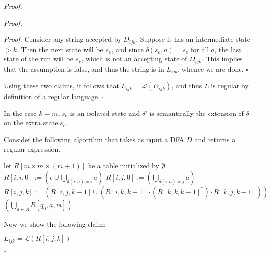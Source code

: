 \documentclass[a4paper]{article}
\newenvironment{proof}{\begin{breakbox}\textit{Proof.}}{\hfill$\square$\end{breakbox}}
\newcommand{\mc}{\mathcal}
\renewcommand{\L}{\mc{L}}
\begin{document}
\begin{proof}
\begin{proof}
        \begin{proof}
            Consider any string accepted by $D_{ijk}$. Suppose it has an intermediate state $> k$. Then the next state will be $s_e$, and since $\delta(s_e, a) = s_e$ for all $a$, the last state of
            the run will be $s_e$, which is not an accepting state of $D_{ijk}$. This implies that the assumption is false, and thus the string is in $L_{ijk}$, whence we are done.
        \end{proof}

        Using these two claims, it follows that $L_{ijk} = \L(D_{ijk})$, and thus $L$ is regular by definition of a regular language.
    \end{proof}
    \begin{note}
        In the case $k = m$, $s_e$ is an isolated state and $\delta'$ is semantically the extension of $\delta$ on the extra state $s_e$.
    \end{note}

    Consider the following algorithm that takes as input a DFA $D$ and returns a regular expression.\\

    \begin{algorithmic}[1]
        \State let $R[m \times m \times (m + 1)]$ be a table initialized by $\emptyset$.
        \State $\displaystyle R[i, i, 0] := \left(\epsilon \cup \bigcup_{\delta(i, a) = i} a\right)$ 
        \Else
        \State $\displaystyle R[i, j, 0] := \left(\bigcup_{\delta(i, a) = j} a\right)$
        \EndIf
        \EndFor
        \EndFor
        \State $R[i, j, k] := \left(R[i, j, k - 1] \cup \left(R[i, k, k - 1] \cdot (R[k, k, k - 1]^*) \cdot R[k, j, k - 1]\right)\right)$
        \EndFor
        \EndFor
        \EndFor
        \State \Return $\displaystyle \left(\bigcup_{a \in A} R[q_0, a, m]\right)$
        \EndFunction
    \end{algorithmic}

    \vspace{1em}
    Now we show the following claim:\\

    \begin{claim}
        $L_{ijk} = \L(R[i, j, k])$
    \end{claim}


\end{proof}
\end{document}
